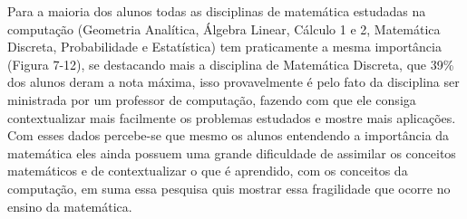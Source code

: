 \documentclass[12pt,a4paper]{article}
\begin{document}
Para a maioria dos alunos todas as disciplinas de matemática estudadas na computação (Geometria Analítica, Álgebra Linear, Cálculo 1 e 2, Matemática Discreta, Probabilidade e Estatística) tem praticamente a mesma importância (Figura 7-12), se destacando mais a disciplina de Matemática Discreta, que 39\% dos alunos deram a nota máxima, isso provavelmente é pelo fato da disciplina ser ministrada por um professor de computação, fazendo com que ele consiga contextualizar mais facilmente os problemas estudados e mostre mais aplicações. 
Com esses dados percebe-se que mesmo os alunos entendendo a importância da matemática eles ainda possuem uma grande dificuldade de assimilar os conceitos matemáticos e de contextualizar o que é aprendido, com os conceitos da computação, em suma essa pesquisa quis mostrar essa fragilidade que ocorre no ensino da matemática. 
\end{document}
